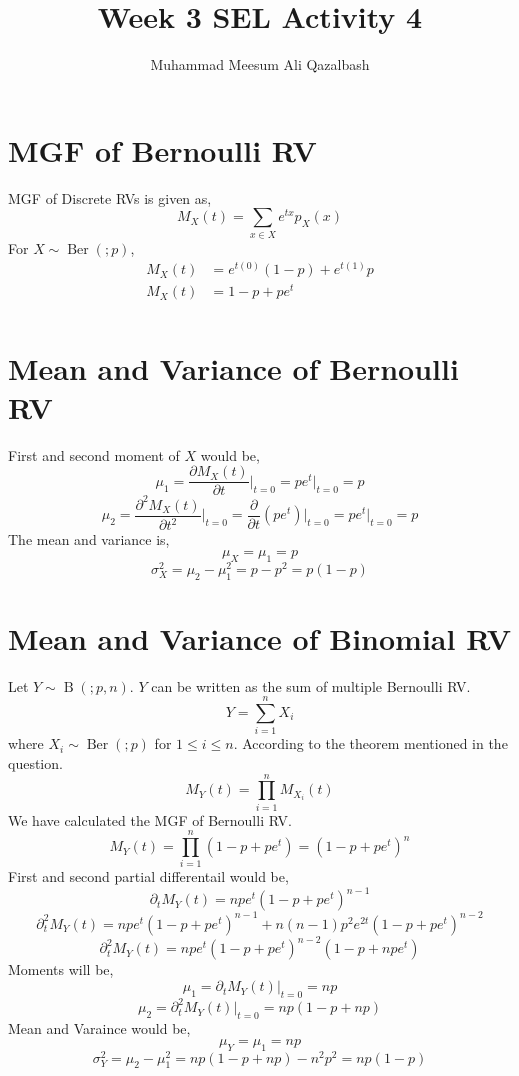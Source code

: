\documentclass{article}
\title{Week 3 SEL Activity 4}
\author{Muhammad Meesum Ali Qazalbash}
\theoremstyle{mytheoremstyle}
\theoremstyle{mytheoremstyle}
\theoremstyle{myproblemstyle}
\begin{document}
\maketitle

\section{MGF of Bernoulli RV}

MGF of Discrete RVs is given as,
\[M_{X}(t)=\sum_{x\in X}e^{tx}p_{X}(x)\]
For \(X\sim \operatorname{Ber}(;p)\),
\begin{equation}
    \begin{split}
        M_{X}(t)&=e^{t(0)}(1-p)+e^{t(1)}p\\
        M_{X}(t)&=1-p+pe^{t}\\
    \end{split}
\end{equation}

\section{Mean and Variance of Bernoulli RV}

First and second moment of \(X\) would be,
\[\mu_1=\frac{\partial M_{X}(t)}{\partial t}\bigg|_{t=0}=pe^{t}\bigg|_{t=0}=p\]
\[\mu_2=\frac{\partial^2 M_{X}(t)}{\partial t^2}\bigg|_{t=0}=\frac{\partial}{\partial t}\left(pe^{t}\right)\bigg|_{t=0}=pe^{t}\bigg|_{t=0}=p\]
The mean and variance is,
\[\mu_{X}=\mu_1=p\]
\[\sigma_{X}^{2}=\mu_2-\mu_1^2=p-p^2=p(1-p)\]

\section{Mean and Variance of Binomial RV}

Let \(Y\sim \operatorname{B}(;p,n)\). \(Y\) can be written as the sum of multiple Bernoulli RV.
\[Y=\sum_{i=1}^{n}X_i\]
where \(X_i\sim \operatorname{Ber}(;p)\) for \(1\le i\le n\). According to the theorem mentioned in the question.
\[M_{Y}(t)=\prod_{i=1}^{n}M_{X_{i}}(t)\]
We have calculated the MGF of Bernoulli RV.
\[M_{Y}(t)=\prod_{i=1}^{n}\left(1-p+pe^{t}\right)=\left(1-p+pe^{t}\right)^n\]
First and second partial differentail would be,
\[\partial_{t}M_{Y}(t)=npe^{t}\left(1-p+pe^{t}\right)^{n-1}\]
\[\partial_{t}^{2}M_{Y}(t)=npe^{t}\left(1-p+pe^{t}\right)^{n-1}+n(n-1)p^2e^{2t}\left(1-p+pe^{t}\right)^{n-2}\]
\[\partial_{t}^{2}M_{Y}(t)=npe^{t}\left(1-p+pe^{t}\right)^{n-2}\left(1-p+npe^{t}\right)\]
Moments will be,
\[\mu_1=\partial_{t}M_{Y}(t)\big|_{t=0}=np\]
\[\mu_2=\partial_{t}^{2}M_{Y}(t)\big|_{t=0}=np(1-p+np)\]
Mean and Varaince would be,
\[\mu_{Y}=\mu_{1}=np\]
\[\sigma_{Y}^2=\mu_2-\mu_1^2=np(1-p+np)-n^2p^2=np(1-p)\]
\end{document}
